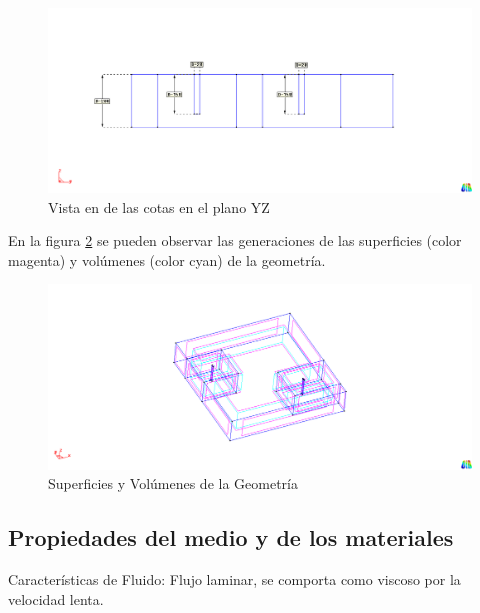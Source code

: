 \documentclass[10pt,a4paper,final]{article}
\begin{document}
%
\begin{figure}[tbhp]
\centerline{\includegraphics[scale=0.75]{img/cotas_grales_YZ}}
\caption{Vista en de las cotas en el plano YZ}
\label{cotas_grales_YZ}
\end{figure}
%
En la figura \ref{superficies_y_volumenes} se pueden observar las generaciones de las superficies (color magenta) y volúmenes (color cyan)
de la geometría.
%
\begin{figure}[tbhp]
\centerline{\includegraphics[scale=0.75]{img/superficies_y_volumenes}}
\caption{Superficies y Volúmenes de la Geometría}
\label{superficies_y_volumenes}
\end{figure}
%
%
%

%
\subsection{Propiedades del medio y de los materiales}
Características de Fluido: Flujo laminar, se comporta como viscoso por
la velocidad lenta.
\end{document}
